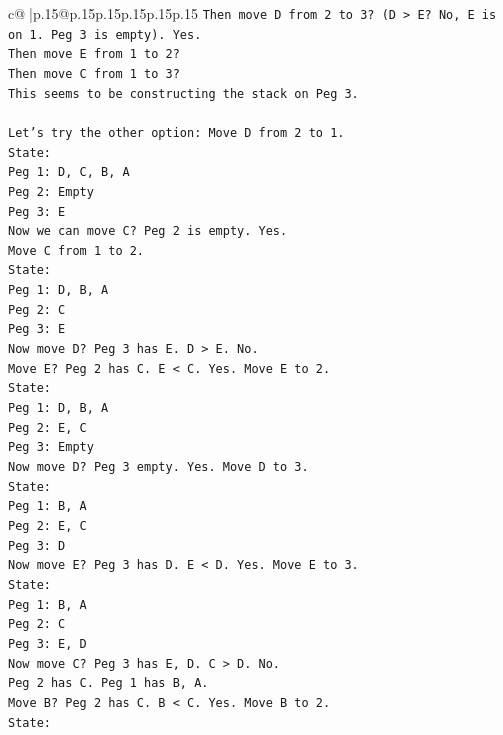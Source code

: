 \documentclass{article}
\begin{document}
{\begin{supertabular}{c@{$\;$}|p{.15\linewidth}@{}p{.15\linewidth}p{.15\linewidth}p{.15\linewidth}p{.15\linewidth}p{.15\linewidth}}
{{{\texttt{Then move D from 2 to 3? (D > E? No, E is on 1. Peg 3 is empty). Yes.} \\
\texttt{Then move E from 1 to 2?} \\
\texttt{Then move C from 1 to 3?} \\
\texttt{This seems to be constructing the stack on Peg 3.} \\
\\ 
\texttt{Let's try the other option: Move D from 2 to 1.} \\
\texttt{State:} \\
\texttt{Peg 1: D, C, B, A} \\
\texttt{Peg 2: Empty} \\
\texttt{Peg 3: E} \\
\texttt{Now we can move C? Peg 2 is empty. Yes.} \\
\texttt{Move C from 1 to 2.} \\
\texttt{State:} \\
\texttt{Peg 1: D, B, A} \\
\texttt{Peg 2: C} \\
\texttt{Peg 3: E} \\
\texttt{Now move D? Peg 3 has E. D > E. No.} \\
\texttt{Move E? Peg 2 has C. E < C. Yes. Move E to 2.} \\
\texttt{State:} \\
\texttt{Peg 1: D, B, A} \\
\texttt{Peg 2: E, C} \\
\texttt{Peg 3: Empty} \\
\texttt{Now move D? Peg 3 empty. Yes. Move D to 3.} \\
\texttt{State:} \\
\texttt{Peg 1: B, A} \\
\texttt{Peg 2: E, C} \\
\texttt{Peg 3: D} \\
\texttt{Now move E? Peg 3 has D. E < D. Yes. Move E to 3.} \\
\texttt{State:} \\
\texttt{Peg 1: B, A} \\
\texttt{Peg 2: C} \\
\texttt{Peg 3: E, D} \\
\texttt{Now move C? Peg 3 has E, D. C > D. No.} \\
\texttt{Peg 2 has C. Peg 1 has B, A.} \\
\texttt{Move B? Peg 2 has C. B < C. Yes. Move B to 2.} \\
\texttt{State:} \\
}}}
\end{supertabular}}
\end{document}
